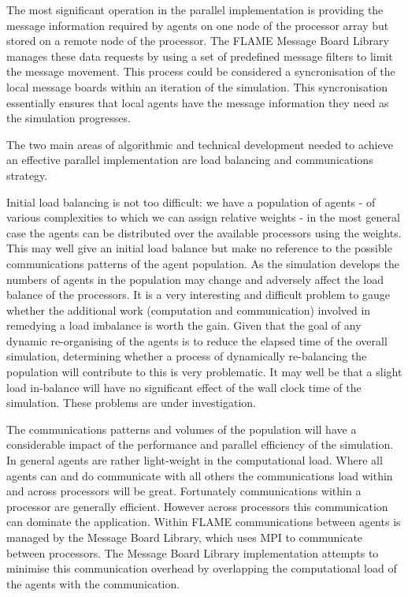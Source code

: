 The most significant operation in the parallel implementation is providing the message information required by agents on one node of the processor array but stored on a remote node of the processor. The FLAME Message Board Library manages these data requests by using a set of predefined message filters to limit the message movement. This process could be considered a syncronisation of the local message boards within an iteration of the simulation. This syncronisation essentially ensures that local agents have the message information they need as the simulation progresses.

The two main areas of algorithmic and technical development needed to achieve an effective parallel implementation are load balancing and communications strategy. 

Initial load balancing is not too difficult: we have a population of agents - of various complexities to which we can assign relative weights - in the most general case the agents can be distributed over the available processors using the weights. This may well give an initial load balance but make no reference to the possible communications patterns of the agent population. As the simulation develops the numbers of agents in the population may change and adversely affect the load balance of the processors. It is a very interesting and difficult problem to gauge whether the additional work (computation and communication) involved in remedying a load imbalance  is worth the gain. Given that the goal of any dynamic re-organising of the agents is to reduce the elapsed time of the overall simulation, determining whether a process of dynamically re-balancing the population will contribute to this is very problematic. It may well be that a slight load in-balance will have no significant effect of the wall clock time of the simulation. These problems are under investigation.

The communications patterns and volumes of the population will have a considerable impact of the performance and parallel efficiency of the simulation. In general agents are rather light-weight in the computational load. Where all agents can and do communicate with all others the communications load within and across processors will be great. Fortunately communications within a processor are generally efficient. However across processors this communication can dominate the application. Within FLAME communications between agents is managed by the Message Board Library, which uses MPI to communicate between processors. The Message Board Library implementation attempts to minimise this communication overhead by overlapping the computational load of the agents with the communication. 

